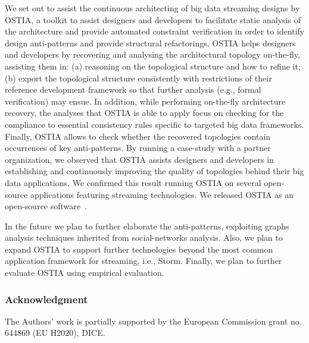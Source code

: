 We set out to assist the continuous architecting of big data streaming designs by OSTIA, a toolkit to assist designers and developers to facilitate static analysis of the architecture and provide automated constraint verification in order to identify design anti-patterns and provide structural refactorings. OSTIA helps designers and developers by recovering and analysing the architectural topology on-the-fly, assisting them in: (a) reasoning on the topological structure and how to refine it; (b) export the topological structure consistently with restrictions of their reference development framework so that further analysis (e.g., formal verification) may ensue. In addition, while performing on-the-fly architecture recovery, the analyses that OSTIA is able to apply focus on checking for the compliance to essential consistency rules specific to targeted big data frameworks. Finally, OSTIA allows to check whether the recovered topologies contain occurrences of key anti-patterns. By running a case-study with a partner organization, we observed that OSTIA assists designers and developers in establishing and continuously improving the quality of topologies behind their big data applications. We confirmed this result running OSTIA on several open-source applications featuring streaming technologies. We released OSTIA as an open-source software~\cite{ostia}. %
 
In the future we plan to further elaborate the anti-patterns, 
exploiting graphs analysis techniques inherited from social-networks analysis. Also, we plan to expand OSTIA to support further technologies beyond the most common application framework for streaming, i.e., Storm. Finally, we plan to further evaluate OSTIA using empirical evaluation.

{\small\subsubsection*{Acknowledgment} The Authors' work is partially supported by the European Commission grant no. 644869 (EU H2020), DICE.}

